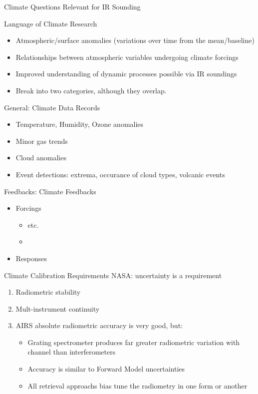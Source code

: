 \documentclass[presentation]{beamer}
\begin{document}
\begin{frame}[label={sec:org2dd4c47}]{Climate Questions Relevant for IR Sounding}
\begin{block}{Language of Climate Research}
\begin{itemize}
\item Atmospheric/surface anomalies (variations over time from the mean/baseline)
\item Relationships between atmospheric variables undergoing climate forcings
\item Improved understanding of dynamic processes possible via IR soundings

\item Break into two categories, although they overlap.
\end{itemize}
\end{block}

\begin{block}{General: Climate Data Records}
\begin{itemize}
\item Temperature, Humidity, Ozone anomalies
\item Minor gas trends
\item Cloud anomalies
\item Event detections: extrema, occurance of cloud types, volcanic events
\end{itemize}
\end{block}

\begin{block}{Feedbacks: Climate Feedbacks}
\begin{itemize}
\item Forcings
\begin{itemize}
\item \cd etc.
\item 
\end{itemize}
\item Responses
\end{itemize}
\end{block}
\end{frame}

\begin{frame}[label={sec:org95053b2}]{Climate Calibration Requirements}
NASA: uncertainty is a requirement

\begin{enumerate}
\item Radiometric stability
\item Mult-instrument continuity

\item AIRS absolute radiometric accuracy is very good, but:
\begin{itemize}
\item Grating spectrometer produces far greater radiometric variation with channel than interferometers
\item Accuracy is similar to Forward Model uncertainties
\item All retrieval approachs bias tune the radiometry in one form or another
\end{itemize}
\end{enumerate}
\end{frame}
\end{document}

